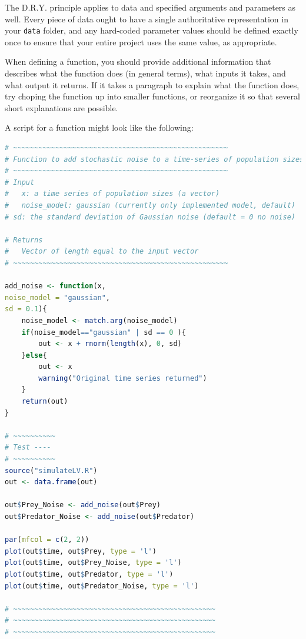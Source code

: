 \documentclass[12pt,letterpaper]{article}
\begin{document}
\begin{tcolorbox}[breakable, enhanced, before upper={\parindent15pt}]
	\noindent
	The D.R.Y. 
	principle applies to data and specified arguments and parameters as well.  
	Every piece of data ought to have a single authoritative representation in 
	your \texttt{data} folder, and any hard-coded parameter values should be 
	defined exactly once to ensure that your entire project uses the same value, 
	as appropriate.
\end{tcolorbox}
	
	
When defining a function, you should provide additional information that describes what the function 
does (in general terms), what inputs it takes, and what output it returns.
If it takes a paragraph to explain what the function does, try choping the function up into smaller 
functions, or reorganize it so that several short explanations are possible.

A script for a function might look like the following:
\clearpage

\begin{lstlisting}[language=R]
# ~~~~~~~~~~~~~~~~~~~~~~~~~~~~~~~~~~~~~~~~~~~~~~~~~~~
# Function to add stochastic noise to a time-series of population sizes
# ~~~~~~~~~~~~~~~~~~~~~~~~~~~~~~~~~~~~~~~~~~~~~~~~~~~
# Input
#	x: a time series of population sizes (a vector)
#	noise_model: gaussian (currently only implemented model, default)
# sd: the standard deviation of Gaussian noise (default = 0 no noise)

# Returns
#	Vector of length equal to the input vector
# ~~~~~~~~~~~~~~~~~~~~~~~~~~~~~~~~~~~~~~~~~~~~~~~~~~~

add_noise <- function(x, 
noise_model = "gaussian", 
sd = 0.1){
	noise_model <- match.arg(noise_model)
	if(noise_model=="gaussian" | sd == 0 ){
		out <- x + rnorm(length(x), 0, sd)
	}else{
		out <- x
		warning("Original time series returned")
	}
	return(out)
}

# ~~~~~~~~~~
# Test ----
# ~~~~~~~~~~
source("simulateLV.R")
out <- data.frame(out)

out$Prey_Noise <- add_noise(out$Prey)
out$Predator_Noise <- add_noise(out$Predator)

par(mfcol = c(2, 2))
plot(out$time, out$Prey, type = 'l')
plot(out$time, out$Prey_Noise, type = 'l')
plot(out$time, out$Predator, type = 'l')
plot(out$time, out$Predator_Noise, type = 'l')

# ~~~~~~~~~~~~~~~~~~~~~~~~~~~~~~~~~~~~~~~~~~~~~~~~
# ~~~~~~~~~~~~~~~~~~~~~~~~~~~~~~~~~~~~~~~~~~~~~~~~
# ~~~~~~~~~~~~~~~~~~~~~~~~~~~~~~~~~~~~~~~~~~~~~~~~
\end{lstlisting}
\end{document}
